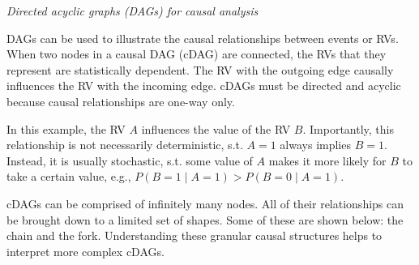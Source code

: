 \documentclass[nobib]{tufte-handout}
\begin{document}
\begin{InfoBox}
\centering
 \colorbox{mygray}{
    \begin{minipage}{1\textwidth}
    \medskip
    \emph{Directed acyclic graphs (DAGs) for causal analysis}
    \medskip

    DAGs can be used to illustrate the causal relationships between events or RVs.
    When two nodes in a causal DAG (cDAG) are connected, the RVs that they represent are statistically dependent.
    The RV with the outgoing edge causally influences the RV with the incoming edge.
    cDAGs must be directed and acyclic because causal relationships are one-way only.
    \begin{center}
    \end{center}
    In this example, the RV $A$ influences the value of the RV $B$.
    Importantly, this relationship is not necessarily  deterministic, s.t. $A=1$ always implies $B=1$.
    Instead, it is usually stochastic, s.t. some value of $A$ makes it more likely for $B$ to take a certain value, e.g., $P(B=1 \mid A=1) > P(B=0 \mid A=1)$.

    cDAGs can be comprised of infinitely many nodes.
    All of their relationships can be brought down to a limited set of shapes.
    Some of these are shown below: the chain and the fork.
    Understanding these granular causal structures helps to interpret more complex cDAGs.

    \begin{center}
\end{center}
\end{minipage}}
\end{InfoBox}
\end{document}
